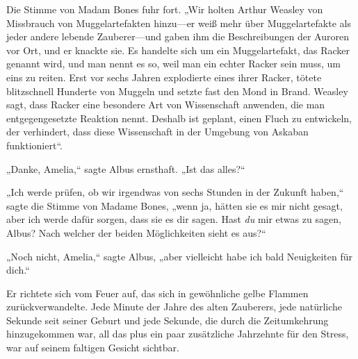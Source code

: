 Die Stimme von Madam Bones fuhr fort. „Wir holten Arthur Weasley von Missbrauch von Muggelartefakten hinzu—er weiß mehr über Muggelartefakte als jeder andere lebende Zauberer—und gaben ihm die Beschreibungen der Auroren vor Ort, und er knackte sie. Es handelte sich um ein Muggelartefakt, das Racker genannt wird, und man nennt es so, weil man ein echter Racker sein muss, um eins zu reiten. Erst vor sechs Jahren explodierte eines ihrer Racker, tötete blitzschnell Hunderte von Muggeln und setzte fast den Mond in Brand. Weasley sagt, dass Racker eine besondere Art von Wissenschaft anwenden, die man entgegengesetzte Reaktion nennt. Deshalb ist geplant, einen Fluch zu entwickeln, der verhindert, dass diese Wissenschaft in der Umgebung von Askaban funktioniert“.

„Danke, Amelia,“ sagte Albus ernsthaft. „Ist das alles?“

„Ich werde prüfen, ob wir irgendwas von sechs Stunden in der Zukunft haben,“ sagte die Stimme von Madame Bones, „wenn ja, hätten sie es mir nicht gesagt, aber ich werde dafür sorgen, dass sie es dir sagen. Hast \emph{du} mir etwas zu sagen, Albus? Nach welcher der beiden Möglichkeiten sieht es aus?“

„Noch nicht, Amelia,“ sagte Albus, „aber vielleicht habe ich bald Neuigkeiten für dich.“

Er richtete sich vom Feuer auf, das sich in gewöhnliche gelbe Flammen zurückverwandelte. Jede Minute der Jahre des alten Zauberers, jede natürliche Sekunde seit seiner Geburt und jede Sekunde, die durch die Zeitumkehrung hinzugekommen war, all das plus ein paar zusätzliche Jahrzehnte für den Stress, war auf seinem faltigen Gesicht sichtbar.

